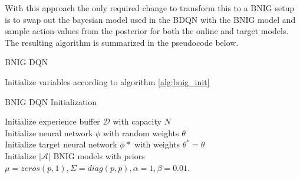 With this approach the only required change to transform this to a BNIG setup is to swap out the bayesian model used in the BDQN with the BNIG model and sample action-values from the posterior for both the online and target models. The resulting algorithm is summarized in the pseudocode below.

\begin{algorithm}[H]
    \caption{BNIG DQN}
    Initialize variables according to algorithm \ref{alg:bnig_init} \\
\end{algorithm}

\begin{algorithm}[H]
    \caption{BNIG DQN Initialization}
    \label{alg:bdqn_init}
    Initialize experience buffer $\mathcal{D}$ with capacity $N$\\
    Initialize neural network $\phi$ with random weights $\theta$\\
    Initialize target neural network $\phi*$ with weights $\theta^*=\theta$\\
    Initialize $|\mathcal{A}|$ BNIG models with priors $\mu = zeros(p,1), \Sigma = diag(p,p), \alpha = 1, \beta = 0.01$.
\end{algorithm}

